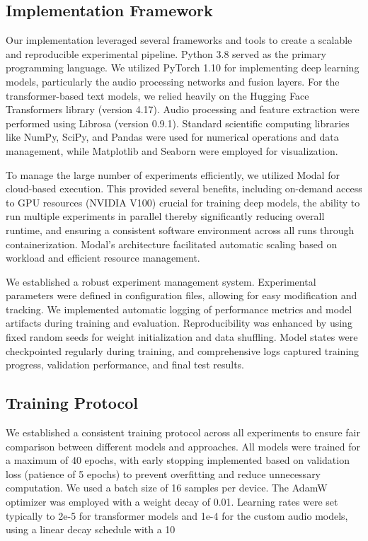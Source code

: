 \documentclass[12pt]{article}
\begin{document}
\subsection{Implementation Framework}
Our implementation leveraged several frameworks and tools to create a scalable and reproducible experimental pipeline. Python 3.8 served as the primary programming language. We utilized PyTorch 1.10 for implementing deep learning models, particularly the audio processing networks and fusion layers. For the transformer-based text models, we relied heavily on the Hugging Face Transformers library (version 4.17). Audio processing and feature extraction were performed using Librosa (version 0.9.1). Standard scientific computing libraries like NumPy, SciPy, and Pandas were used for numerical operations and data management, while Matplotlib and Seaborn were employed for visualization.

To manage the large number of experiments efficiently, we utilized Modal for cloud-based execution. This provided several benefits, including on-demand access to GPU resources (NVIDIA V100) crucial for training deep models, the ability to run multiple experiments in parallel thereby significantly reducing overall runtime, and ensuring a consistent software environment across all runs through containerization. Modal's architecture facilitated automatic scaling based on workload and efficient resource management.

We established a robust experiment management system. Experimental parameters were defined in configuration files, allowing for easy modification and tracking. We implemented automatic logging of performance metrics and model artifacts during training and evaluation. Reproducibility was enhanced by using fixed random seeds for weight initialization and data shuffling. Model states were checkpointed regularly during training, and comprehensive logs captured training progress, validation performance, and final test results.

\subsection{Training Protocol}
We established a consistent training protocol across all experiments to ensure fair comparison between different models and approaches. All models were trained for a maximum of 40 epochs, with early stopping implemented based on validation loss (patience of 5 epochs) to prevent overfitting and reduce unnecessary computation. We used a batch size of 16 samples per device. The AdamW optimizer was employed with a weight decay of 0.01. Learning rates were set typically to 2e-5 for transformer models and 1e-4 for the custom audio models, using a linear decay schedule with a 10%
\end{document}
